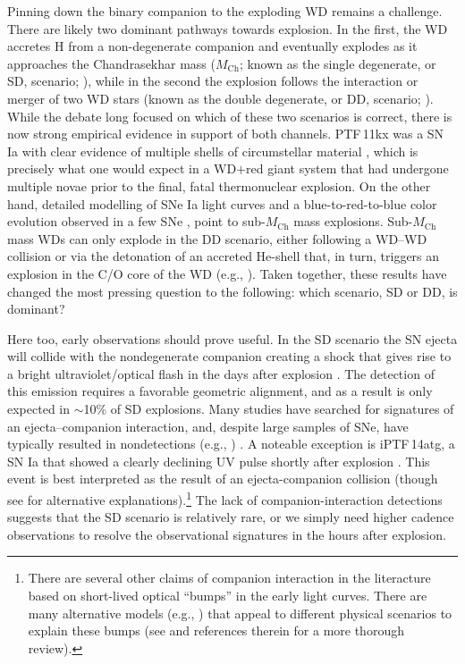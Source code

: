 \documentclass[twocolumn]{./aastex63}
\begin{document}
Pinning down the binary companion to the exploding WD remains a challenge. There
are likely two dominant pathways towards explosion. In the first, the WD
accretes H from a non-degenerate companion and eventually explodes as it
approaches the Chandrasekhar mass ($M_\mathrm{Ch}$; known as the single
degenerate, or SD, scenario; \citealt{Whelan73}), while in the second the
explosion follows the interaction or merger of two WD stars (known as the double
degenerate, or DD, scenario; \citealt{Webbink84}). While the debate long focused
on which of these two scenarios is correct, there is now strong empirical
evidence in support of both channels. PTF\,11kx was a SN Ia with clear evidence
of multiple shells of circumstellar material \citep{Dilday12}, which is
precisely what one would expect in a WD$+$red giant system that had undergone
multiple novae prior to the final, fatal thermonuclear explosion. On the other
hand, detailed modelling of SNe Ia light curves \citep{Scalzo14a} and a
blue-to-red-to-blue color evolution observed in a few SNe \citep{Jiang17,De19},
point to sub-$M_\mathrm{Ch}$ mass explosions. Sub-$M_\mathrm{Ch}$ mass WDs can
only explode in the DD scenario, either following a WD--WD collision or via the
detonation of an accreted He-shell that, in turn, triggers an explosion in the
C/O core of the WD (e.g., \citealt{Polin19}). Taken together, these results have
changed the most pressing question to the following: which scenario, SD or DD,
is dominant?

Here too, early observations should prove useful. In the SD scenario the SN
ejecta will collide with the nondegenerate companion creating a shock that gives
rise to a bright ultraviolet/optical flash in the days after explosion
\citep{Kasen10a}. The detection of this emission requires a favorable geometric
alignment, and as a result is only expected in $\sim$10\% of SD explosions. Many
studies have searched for signatures of an ejecta–companion interaction, and,
despite large samples of SNe, have typically resulted in nondetections (e.g.,
\citealt{Hayden10,Ganeshalingam11,Bloom12a,Zheng13,Goobar15,Olling15,Shappee16a})
. A noteable exception is iPTF\,14atg, a SN Ia that showed a clearly declining
UV pulse shortly after explosion \citep{Cao15}. This event is best interpreted
as the result of an ejecta-companion collision (though see
\citealt{Kromer16,Noebauer17} for alternative explanations).\footnote{There are
several other claims of companion interaction in the literacture based on
short-lived optical ``bumps'' in the early light curves. There are many
alternative models (e.g., \citealt{Dessart14,Piro16}) that appeal to different
physical scenarios to explain these bumps (see \citealt{Shappee16a,Miller18} and
references therein for a more thorough review).} The lack of
companion-interaction detections suggests that the SD scenario is relatively
rare, or we simply need higher cadence observations to resolve the observational
signatures in the hours after explosion.
\end{document}

